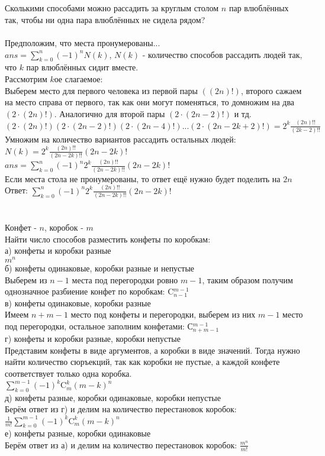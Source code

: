 \documentclass{article}
\begin{document}
\section{}
Сколькими способами можно рассадить за круглым столом $n$ пар влюблённых так, чтобы ни одна пара влюблённых не сидела рядом?\\\\
Предположим, что места пронумерованы...\\
$ans=\sum\limits_{k=0}^n(-1)^{n}N(k)$, $N(k)$ - количество способов рассадить людей так, что $k$ пар влюблённых сидит вместе.\\
Рассмотрим $k$ое слагаемое:\\ Выберем место для первого человека из первой пары $((2n)!)$, второго сажаем на место справа от первого, так как они могут поменяться, то домножим на два $(2\cdot(2n)!)$. Аналогично для второй пары $(2\cdot(2n-2)!)$ и тд.\\
$(2\cdot(2n)!)(2\cdot(2n-2)!)(2\cdot(2n-4)!)...(2\cdot(2n-2k+2)!)=2^k\frac{(2n)!!}{(2k-2)!!}$\\
Умножим на количество вариантов рассадить остальных людей:\\ $N(k)=2^k\frac{(2n)!!}{(2n-2k)!!}(2n-2k)!$\\
$ans=\sum\limits_{k=0}^n(-1)^{n}2^k\frac{(2n)!!}{(2n-2k)!!}(2n-2k)!$
\\Если места стола не пронумерованы, то ответ ещё нужно будет поделить на $2n$\\
Ответ: $\sum\limits_{k=0}^n(-1)^{n}2^k\frac{(2n)!!}{(2n-2k)!!}(2n-2k)!$
\section{}
Конфет - $n$, коробок - $m$\\
Найти число способов разместить конфеты по коробкам:\\
а) конфеты и коробки разные\\
$m^n$\\
б) конфеты одинаковые, коробки разные и непустые\\
Выберем из $n-1$ места под перегородки ровно $m-1$, таким образом получим однозначное разбиение конфет по коробкам: C$^{m-1}_{n-1}$\\
в) конфеты одинаковые, коробки разные\\
Имеем $n+m-1$ место под конфеты и перегородки, выберем из них $m-1$ место под перегородки, остальное заполним конфетами: С$^{m-1}_{n+m-1}$\\
г) конфеты и коробки разные, коробки непустые\\
Представим конфеты в виде аргументов, а коробки в виде значений. Тогда нужно найти количество сюръекций, так как коробки не пустые, а каждой конфете соответствует только одна коробка.\\
$\sum\limits_{k=0}^{m-1}(-1)^k\text{C}^k_m(m-k)^n$\\
д) конфеты разные, коробки одинаковые, коробки непустые\\
Берём ответ из г) и делим на количество перестановок коробок:
$\frac{1}{m!}\sum\limits_{k=0}^{m-1}(-1)^k\text{C}^k_m(m-k)^n$\\
е) конфеты разные, коробки одинаковые\\
Берём ответ из а) и делим на количество перестановок коробок: $\frac{m^n}{m!}$
\end{document}
